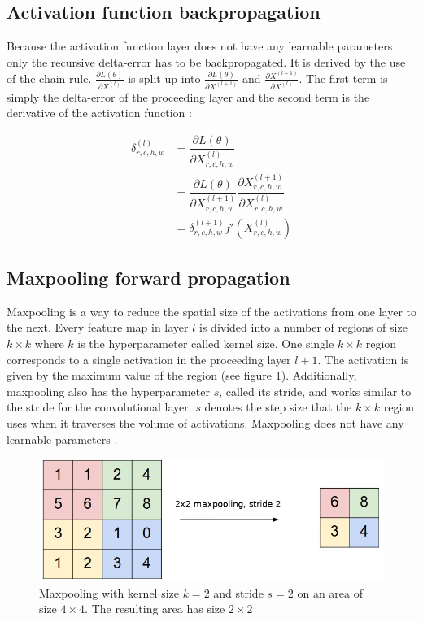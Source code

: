 \documentclass[a4paper, twoside]{article}
\newcommand*{\pd}[2]{\ensuremath{\dfrac{\partial #1}{\partial #2}}}
\newcommand*{\inpd}[2]{\ensuremath{\frac{\partial #1}{\partial #2}}}
\begin{document}
\subsection{Activation function backpropagation}
Because the activation function layer does not have any learnable parameters only the recursive delta-error has to be backpropagated. It is derived by the use of the chain rule. $\inpd{L(\theta)}{X^{(l)}}$ is split up into $\inpd{L(\theta)}{X^{(l+1)}}$ and $\inpd{X^{(l+1)}}{X^{(l)}}$. The first term is simply the delta-error of the proceeding layer and the second term is the derivative of the activation function \cite{cs231n} \cite{convmath}: 

\begin{equation}
\begin{split}
\delta^{(l)}_{r,c,h,w}
		& = \pd{L(\theta)}{X^{(l)}_{r,c,h,w}} \\
		& = \pd{L(\theta)}{X^{(l+1)}_{r,c,h,w}} \pd{X^{(l+1)}_{r,c,h,w}}{X^{(l)}_{r,c,h,w}} \\
		& = \delta^{(l+1)}_{r,c,h,w} f'(X^{(l)}_{r,c,h,w})
\end{split}
\end{equation}

\subsection{Maxpooling forward propagation}
Maxpooling is a way to reduce the spatial size of the activations from one layer to the next. Every feature map in layer $l$ is divided into a number of regions of size $k \times k$ where $k$ is the hyperparameter called kernel size. One single $k \times k$ region corresponds to a single activation in the proceeding layer $l+1$. The activation is given by the maximum value of the region (see figure \ref{figmaxpool}). Additionally, maxpooling also has the hyperparameter $s$, called its stride, and works similar to the stride for the convolutional layer. $s$ denotes the step size that the $k \times k$ region uses when it traverses the volume of activations. Maxpooling does not have any learnable parameters \cite{cs231n} \cite{convmath} \cite{convarithmetic}. 

\begin{figure}[h]
	\centering
  		\includegraphics[scale=0.7]{maxpool.png}
  	\caption{Maxpooling with kernel size $k=2$ and stride $s=2$ on an area of size $4 \times 4$. The resulting area has size $2 \times 2$ \cite{figkonv}} \label{figmaxpool}
\end{figure}
\end{document}
